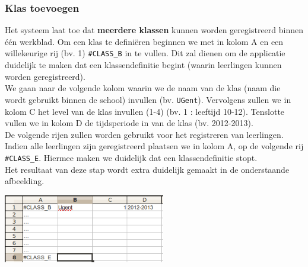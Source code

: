 \begin{section}
\begin{subsection}
\subsubsection*{Klas toevoegen}
Het systeem laat toe dat \textbf{meerdere klassen} kunnen worden geregistreerd binnen \'e\'en werkblad. Om een klas te defini\"eren beginnen we met in kolom A en een willekeurige rij (bv. 1) \texttt{\#CLASS\_B} in te vullen. Dit zal dienen om de applicatie duidelijk te maken dat een klassendefinitie begint (waarin leerlingen kunnen worden geregistreerd).\\
We gaan naar de volgende kolom waarin we de naam van de klas (naam die wordt gebruikt binnen de school) invullen (bv. \texttt{UGent}). Vervolgens zullen we in kolom C het level van de klas invullen (1-4) (bv. 1 : leeftijd 10-12). Tenslotte vullen we in kolom D de tijdsperiode in van de klas (bv. 2012-2013).\\
De volgende rijen zullen worden gebruikt voor het registreren van leerlingen. Indien alle leerlingen zijn geregistreerd plaatsen we in kolom A, op de volgende rij \texttt{\#CLASS\_E}. Hiermee maken we duidelijk dat een klassendefinitie stopt.\\
Het resultaat van deze stap wordt extra duidelijk gemaakt in de onderstaande afbeelding. 
\begin{center}
\includegraphics[height=3cm]{img/klas.png}
\end{center}

\end{subsection}
\end{section}
